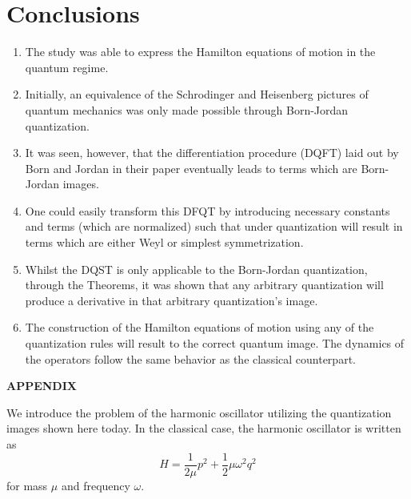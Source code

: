 \documentclass[a4paper]{article}
\theoremstyle{definition}
\begin{document}
\section{Conclusions}
\begin{enumerate}
	\item The study was able to express the Hamilton equations of motion in the quantum regime.
	\item Initially, an equivalence of the Schrodinger and Heisenberg pictures of quantum mechanics was only made possible through Born-Jordan quantization.
	\item It was seen, however, that the differentiation procedure (DQFT) laid out by Born and Jordan in their paper eventually leads to terms which are Born-Jordan images.
	\item One could easily transform this DFQT by introducing necessary constants and terms (which are normalized) such that under quantization will result in terms which are either Weyl or simplest symmetrization.
	\item Whilst the DQST is only applicable to the Born-Jordan quantization, through the Theorems, it was shown that any arbitrary quantization will produce a derivative in that arbitrary quantization's image.
	\item The construction of the Hamilton equations of motion using any of the quantization rules will result to the correct quantum image. The dynamics of the operators follow the same behavior as the classical counterpart.
\end{enumerate}

\newpage
\printbibliography

\vspace{0.25cm}
\begin{center}
	{\Large\textbf{APPENDIX}}
\end{center}
We introduce the problem of the harmonic oscillator utilizing the quantization images shown here today. In the classical case, the harmonic oscillator is written as
\begin{equation}\label{eqn:harmonic oscillator}
	H=\frac{1}{2\mu}p^2+\frac{1}{2}\mu\omega^2q^2
\end{equation}
for mass $\mu$ and frequency $\omega$.
\end{document}
